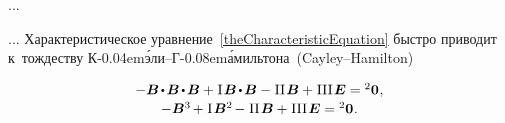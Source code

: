 \begin{otherlanguage}{russian}
...



...
Характеристическое уравнение~\eqref{theCharacteristicEquation}
быстро приводит к~тождеству К\kern-0.04em\'{э}ли\hbox{--}Г\kern-0.08em\'{а}мильтона~(Cayley\hbox{--}Hamilton)

\nopagebreak\vspace{-0.2em}\begin{equation}\label{cayley-hamilton equation}
\begin{array}{c}
-\bm{B} \hspace{-0.2ex} \dotp \hspace{-0.2ex} \bm{B} \hspace{-0.2ex} \dotp \hspace{-0.2ex} \bm{B}
+ \hspace{.1ex} \mathrm{I} \hspace{.2ex} \bm{B} \hspace{-0.2ex} \dotp \hspace{-0.2ex} \bm{B}
- \hspace{.1ex} \mathrm{II} \hspace{.2ex} \bm{B}
+ \hspace{.1ex} \mathrm{III} \hspace{.2ex} \UnitDyad
= \zerobivalent
\hspace{.1ex} ,
\\[.16em]
-\bm{B}^{3} \hspace{-0.2ex}
+ \hspace{.1ex} \mathrm{I} \hspace{.2ex} \bm{B}^{2} \hspace{-0.2ex}
- \hspace{.1ex} \mathrm{II} \hspace{.2ex} \bm{B}
+ \hspace{.1ex} \mathrm{III} \hspace{.2ex} \UnitDyad
= \zerobivalent
\hspace{.1ex} .
\end{array}
\end{equation}

\end{otherlanguage}
